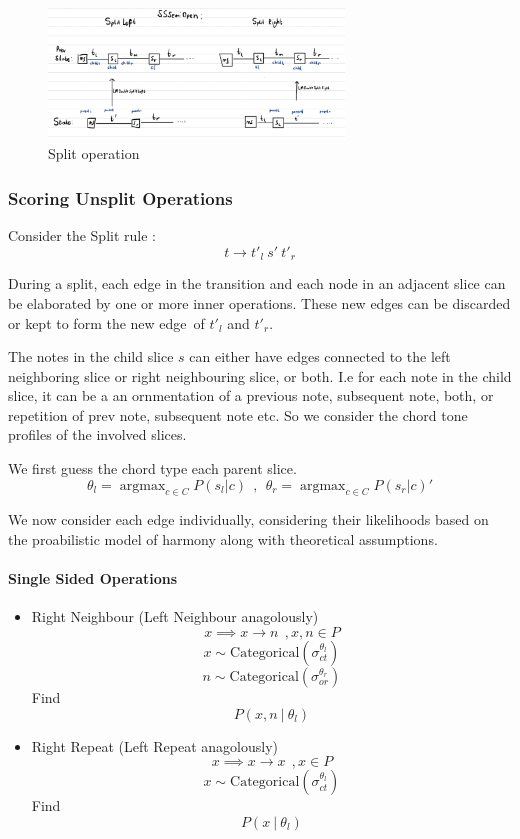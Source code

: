 \documentclass[12pt,a4paper,twoside,openright]{report}
\theoremstyle{definition}
\begin{document}
\begin{figure}[ht]
  \centering
  \includegraphics[width=0.7\textwidth]{splitsssemiopen}
  \caption{Split operation}
  \label{fig:splitoperation}
\end{figure}

\FloatBarrier
\subsubsection{Scoring Unsplit Operations}
Consider the Split rule : \[t \to t'_{l}~s'~t'_{r}\]
\par
During a split, each edge in the transition and each node in an adjacent slice can be elaborated by one or more inner operations.
These new edges can be discarded or kept to form the new edge of $t'_l$ and $t'_r$.
\par 
The notes in the child slice $s$ can either have edges connected to the left neighboring slice or right neighbouring slice, or both. I.e for each note in the child slice, it can be a an ornmentation of a previous note, subsequent note, both, or repetition of prev note, subsequent note etc. So we consider the chord tone profiles of the involved slices. 

We first guess the chord type each parent slice. 
\[\theta_l = \mathop{argmax}_{c \in C} P(s_l|c) ~~,~~ \theta_r = \mathop{argmax}_{c \in C} P(s_r|c) '\]

We now consider each edge individually, considering their likelihoods based on the proabilistic model of harmony along with theoretical assumptions. 

\paragraph{Single Sided Operations} 
\begin{itemize}
  \item Right Neighbour (Left Neighbour anagolously)
    \[ x \implies x \to n~~, x,n \in P \]
    \[x \sim \text{Categorical}(\sigma_{ct}^{\theta_l})\]
    \[n \sim \text{Categorical}(\sigma_{or}^{\theta_r})\]
    Find \[P(x,n~|~\theta_l)\]
  \item Right Repeat (Left Repeat anagolously)
    \[ x \implies x \to x~~, x \in P \]
    \[x \sim \text{Categorical}(\sigma_{ct}^{\theta_l})\]
    Find \[P(x~|~\theta_l)\]
\end{itemize}
\end{document}
